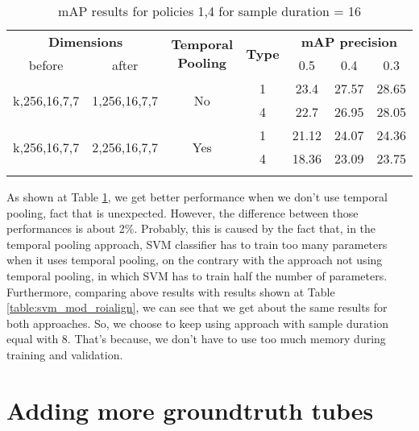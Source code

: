 \begin{center}
\begin{longtable}{||c | c| c| c||c c c||}

  \hline
 \multicolumn{2}{||c|}{\textbf{Dimensions}} & \multirow{2}{4.5em}{\textbf{Temporal Pooling}} &\multirow{2}{*}{ \textbf{Type}} &\multicolumn{3}{|c||}{\textbf{mAP precision}}\\

  before & after & {} & {} &  0.5 &  0.4 & 0.3 \\
  \hline   \hline

  \multirow{2}{*}{k,256,16,7,7} & \multirow{2}{*}{1,256,16,7,7} & \multirow{2}{*}{No}  & 1 & 23.4 & 27.57 &28.65  \\
  \cline{4-7}
  {} & {} & {} & 4 & 22.7 & 26.95 & 28.05 \\
  \hline

  \multirow{2}{*}{k,256,16,7,7} & \multirow{2}{*}{2,256,16,7,7} & \multirow{2}{*}{Yes}  & 1 & 21.12 & 24.07 & 24.36  \\
  \cline{4-7}
  {} & {} & {} & 4 & 18.36 & 23.09 & 23.75 \\
  \hline
  \caption{mAP results for  policies 1,4  for sample duration = 16 }
  \label{table:svm_temp_pooling_16}
\end{longtable} 
\end{center}

As shown at Table \ref{table:svm_temp_pooling_16}, we get better performance when we don't use temporal pooling, fact that is unexpected.
However, the difference between those performances is about 2\%. Probably, this is caused by the fact that, in the temporal pooling approach,
SVM classifier has to train too many parameters when it uses temporal pooling, on the contrary with the approach not using temporal pooling,
in which SVM has to train half the number of parameters. Furthermore, comparing above results with results shown at Table  \ref{table:svm_mod_roialign}, we can see that we get about the same results for both approaches. So, we choose to keep using approach with sample duration equal
with 8. That's because, we don't have to use too much memory during training and validation.

\section{Adding more groundtruth tubes}

